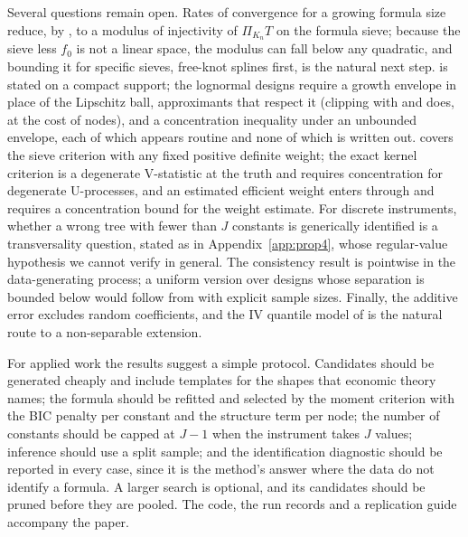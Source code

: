 Several questions remain open. Rates of convergence for a growing formula size reduce, by , to a modulus of injectivity of $\Pi_{K_n}T$ on the formula sieve; because the sieve less $f_0$ is not a linear space, the modulus can fall below any quadratic, and bounding it for specific sieves, free-knot splines first, is the natural next step.  is stated on a compact support; the lognormal designs require a growth envelope in place of the Lipschitz ball, approximants that respect it (clipping with  and  does, at the cost of nodes), and a concentration inequality under an unbounded envelope, each of which appears routine and none of which is written out.  covers the sieve criterion with any fixed positive definite weight; the exact kernel criterion is a degenerate V-statistic at the truth and requires concentration for degenerate U-processes, and an estimated efficient weight enters through  and requires a concentration bound for the weight estimate. For discrete instruments, whether a wrong tree with fewer than $J$ constants is generically identified is a transversality question, stated as  in Appendix~\ref{app:prop4}, whose regular-value hypothesis we cannot verify in general. The consistency result is pointwise in the data-generating process; a uniform version over designs whose separation is bounded below would follow from  with explicit sample sizes. Finally, the additive error excludes random coefficients, and the IV quantile model of \citet{chernozhukovhansen2005} is the natural route to a non-separable extension.

For applied work the results suggest a simple protocol. Candidates should be generated cheaply and include templates for the shapes that economic theory names; the formula should be refitted and selected by the moment criterion with the BIC penalty per constant and the structure term per node; the number of constants should be capped at $J - 1$ when the instrument takes $J$ values; inference should use a split sample; and the identification diagnostic should be reported in every case, since it is the method's answer where the data do not identify a formula. A larger search is optional, and its candidates should be pruned before they are pooled. The code, the run records and a replication guide accompany the paper.
